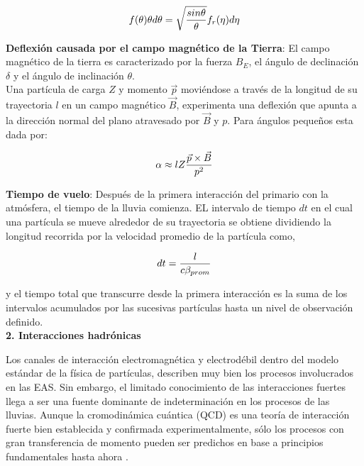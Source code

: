 \begin{equation}
\centering
f(\theta) \theta d\theta = \sqrt{\frac{sin\theta}{\theta}} f_{r}(\eta) d \eta
\label{eq:eq22}
\end{equation}

\textbf{Deflexión causada por el campo magnético de la Tierra}:  El campo magnético de la tierra es caracterizado por la fuerza $B_{E}$, el ángulo de declinación $\delta$ y el ángulo de inclinación $\theta$. \\

Una partícula de carga $Z$ y momento $\Vec{p}$ moviéndose a través de la longitud de su trayectoria $l$ en un campo magnético $\Vec{B}$, experimenta una deflexión que apunta a la dirección normal del plano atravesado por $\Vec{B}$ y $p$. Para ángulos pequeños esta dada por:

\begin{equation}
\centering
\alpha \approx lZ \frac{\Vec{p} \times \Vec{B}}{p^{2}}
\label{eq:eq23}
\end{equation}

\textbf{Tiempo de vuelo}: Después de la primera interacción del primario con la atmósfera, el tiempo de la lluvia comienza. EL intervalo de tiempo $dt$ en el cual una partícula se mueve alrededor de su trayectoria se obtiene dividiendo la longitud recorrida por la velocidad promedio de la partícula como,

\begin{equation}
\centering
dt = \frac{l}{c\beta_{prom}}
\label{eq:eq24}
\end{equation}

y el tiempo total que transcurre desde la primera interacción es la suma de los intervalos acumulados por las sucesivas partículas hasta un nivel de observación definido.\\

\noindent\textbf{2. Interacciones hadr\'onicas}

Los canales de interacción electromagnética y electrodébil dentro del modelo estándar de la física de partículas, describen muy bien los procesos involucrados en las EAS. Sin embargo, el limitado conocimiento de las interacciones fuertes llega a ser una fuente dominante de indeterminación en los procesos de las lluvias. Aunque la cromodinámica cuántica (QCD) es una teoría de interacción fuerte bien establecida y confirmada experimentalmente, sólo los procesos con gran transferencia de momento pueden ser predichos en base a principios fundamentales hasta ahora \citep{Allen}. \\

